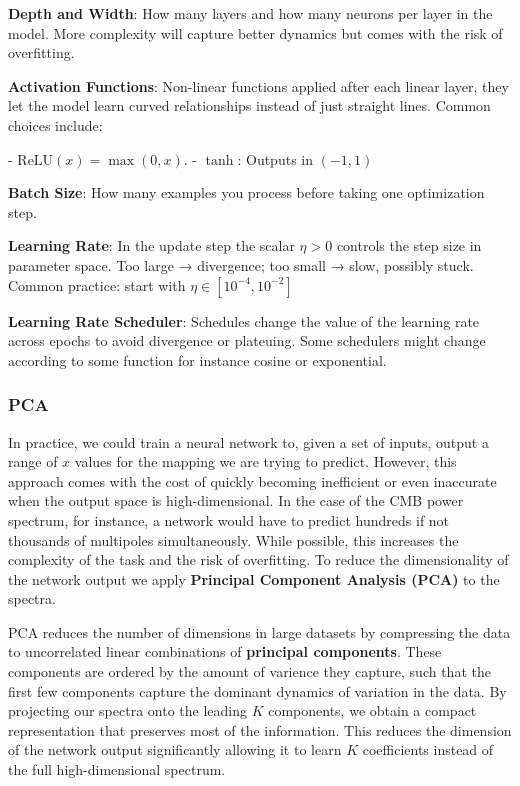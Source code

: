 \documentclass[11pt,a4paper]{article}
\numberwithin{equation}{section}
\begin{document}
\textbf{Depth and Width}: How many layers and how many neurons per layer in the model. More complexity will capture better dynamics but comes with the risk of overfitting.  

\textbf{Activation Functions}: Non-linear functions applied after each linear layer, they let the model learn curved relationships instead of just straight lines. Common choices include: 

- $\mathrm{ReLU}(x)=\max(0,x)$. 
- $\tanh$: Outputs in $(-1,1)$

\textbf{Batch Size}: How many examples you process before taking one optimization step.

\textbf{Learning Rate}: In the update step the scalar $\eta > 0$ controls the step size in parameter space. Too large → divergence; too small → slow, possibly stuck. Common practice: start with $\eta\in[10^{-4},10^{-2}]$

\textbf{Learning Rate Scheduler}: Schedules change the value of the learning rate across epochs to avoid divergence or plateuing. Some schedulers might change according to some function for instance cosine or exponential. 

\subsubsection{PCA}

In practice, we could train a neural network to, given a set of inputs, output a range of $x$ values for the mapping we are trying to predict. 
However, this approach comes with the cost of quickly becoming inefficient or even inaccurate when the output space is high-dimensional. 
In the case of the CMB power spectrum, for instance, a network would have to predict hundreds if not thousands of multipoles simultaneously. While possible, this increases the complexity of the task and the risk of overfitting. 
To reduce the dimensionality of the network output we apply \textbf{Principal Component Analysis (PCA)} to the spectra.

PCA reduces the number of dimensions in large datasets by compressing the data to uncorrelated linear combinations of \textbf{principal components}. 
These components are ordered by the amount of varience they capture, such that the first few components capture the dominant dynamics of variation in the data. 
By projecting our spectra onto the leading $K$ components, we obtain a compact representation that preserves most of the information.
This reduces the dimension of the network output significantly allowing it to learn $K$ coefficients instead of the full high-dimensional spectrum. 
\end{document}
